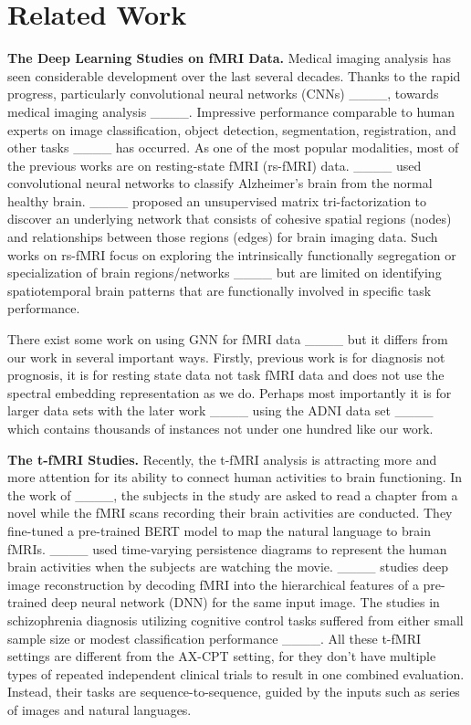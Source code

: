 \section{Related Work}
\label{sec:6}

\textbf{The Deep Learning Studies on fMRI Data.}\label{sec:6.1} Medical imaging analysis has seen considerable development over the last several decades. Thanks to the rapid progress, particularly convolutional neural networks (CNNs) ____, towards medical imaging analysis ____. Impressive performance comparable to human experts on image classification, object detection, segmentation, registration, and other tasks ____ has occurred. As one of the most popular modalities, most of the previous works are on resting-state fMRI (rs-fMRI) data. ____ used convolutional neural networks to classify Alzheimer's brain from the normal healthy brain. ____ proposed an unsupervised matrix tri-factorization to discover an underlying network that consists of cohesive spatial regions (nodes) and relationships between those regions (edges) for brain imaging data. Such works on rs-fMRI focus on exploring the intrinsically functionally segregation or specialization of brain regions/networks ____ but are limited on identifying spatiotemporal brain patterns that are functionally involved in specific task performance. 

There exist some  work on using GNN for fMRI data ____ but it differs from our work in several important ways. Firstly, previous work is for diagnosis not prognosis, it is for resting state data  not task fMRI data and does not use the spectral embedding representation as we do. Perhaps most importantly it is for larger data sets with the later work ____ using the ADNI data set ____ which contains thousands of instances not under one hundred like our work.

\textbf{The t-fMRI Studies.}\label{sec:6.2} Recently, the t-fMRI analysis is attracting more and more attention for its ability to connect human activities to brain functioning. In the work of ____, the subjects in the study are asked to read a chapter from a novel while the fMRI scans recording their brain activities are conducted. They fine-tuned a pre-trained BERT model to map the natural language to brain fMRIs. ____ used time-varying persistence diagrams to represent the human brain activities when the subjects are watching the movie. ____ studies deep image reconstruction by decoding fMRI into the hierarchical features of a pre-trained deep neural network (DNN) for the same input image. The studies in schizophrenia diagnosis utilizing cognitive control tasks suffered from either small sample size or modest classification performance ____. All these t-fMRI settings are different from the AX-CPT setting, for they don't have multiple types of repeated independent clinical trials to result in one combined evaluation. Instead, their tasks are sequence-to-sequence, guided by the inputs such as series of images and natural languages.

